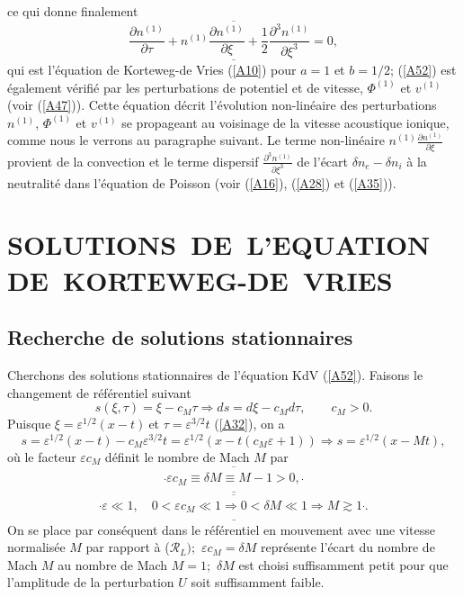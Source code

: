 \documentclass[10pt,thmsa]{article}
\begin{document}
ce qui donne finalement
\begin{equation}
\overline{\underline{\frac{\partial n^{(1)}}{\partial\tau}+n^{(1)}%
\frac{\partial n^{(1)}}{\partial\xi}+\frac{1}{2}\frac{\partial^{3}n^{(1)}%
}{\partial\xi^{3}}=0,}}\label{A52}%
\end{equation}
qui est l'\'{e}quation de Korteweg-de Vries (\ref{A10}) pour $a=1$ et $b=1/2$;
(\ref{A52}) est \'{e}galement v\'{e}rifi\'{e} par les perturbations de
potentiel et de vitesse, $\Phi^{(1)}$ et $v^{(1)}$ (voir (\ref{A47})). Cette
\'{e}quation d\'{e}crit l'\'{e}volution non-lin\'{e}aire des perturbations
$n^{(1)}$, $\Phi^{(1)}$ et $v^{(1)}$ se propageant au voisinage de la vitesse
acoustique ionique, comme nous le verrons au paragraphe suivant. Le terme
non-lin\'{e}aire $n^{(1)}\frac{\partial n^{(1)}}{\partial\xi}$ provient de la
convection et le terme dispersif $\frac{\partial^{3}n^{(1)}}{\partial\xi^{3}}$
de l'\'{e}cart $\delta n_{e}-\delta n_{i}$ \`{a} la neutralit\'{e} dans
l'\'{e}quation de Poisson (voir (\ref{A16}), (\ref{A28}) et (\ref{A35})).

\section{SOLUTIONS\ DE\ L'EQUATION\ DE\ KORTEWEG-DE\ VRIES}

\subsection{Recherche de solutions stationnaires}

Cherchons des solutions stationnaires de l'\'{e}quation KdV (\ref{A52}).
Faisons le changement de r\'{e}f\'{e}rentiel suivant
\begin{equation}
s(\xi,\tau)=\xi-c_{M}\tau\Rightarrow ds=d\xi-c_{M}d\tau,\qquad c_{M}%
>0.\label{A53}%
\end{equation}
Puisque $\xi=\varepsilon^{1/2}(x-t)\ $et $\tau=\varepsilon^{3/2}t$
(\ref{A32}), on a
\begin{equation}
s=\varepsilon^{1/2}(x-t)-c_{M}\varepsilon^{3/2}t=\varepsilon^{1/2}%
(x-t(c_{M}\varepsilon+1))\Rightarrow s=\varepsilon^{1/2}(x-Mt),\label{A70}%
\end{equation}
o\`{u} le facteur $\varepsilon c_{M}$ d\'{e}finit le nombre de Mach $M$ par
\begin{equation}
\underline{\overline{\frac{^{{}}}{{}}\varepsilon c_{M}\equiv\delta M\equiv
M-1>0,\frac{^{{}}}{{}}}}\label{A71}%
\end{equation}
\begin{equation}
\overline{\underline{\frac{^{{}}}{{}}\varepsilon\ll1,\quad0<\varepsilon
c_{M}\ll1\Rightarrow0<\delta M\ll1\Rightarrow M\gtrsim1\frac{^{{}}}{{}}.}%
}\label{AA71}%
\end{equation}
On se place par cons\'{e}quent dans le r\'{e}f\'{e}rentiel en mouvement avec
une vitesse normalis\'{e}e $M$ par rapport \`{a} ($\mathcal{R}_{L});$
$\varepsilon c_{M}=\delta M$ repr\'{e}sente l'\'{e}cart du nombre de Mach $M$
au nombre de Mach $M=1;$ $\delta M$ est choisi suffisamment petit pour que
l'amplitude de la perturbation $U$ soit suffisamment faible.
\end{document}
